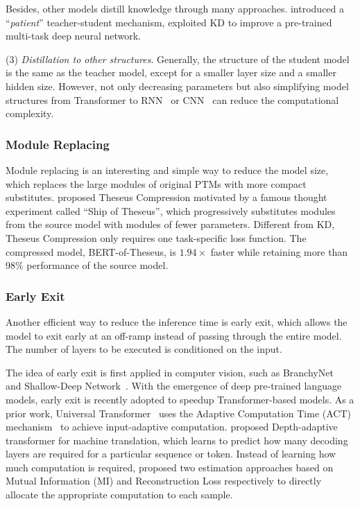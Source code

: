 \documentclass[fleqn]{SCYE-arxiv}
\begin{document}
\begin{multicols}{2}
Besides, other models distill knowledge through many approaches. \citet{sun-etal-2019-patient} introduced a ``\textit{patient}'' teacher-student mechanism, \citet{liu2019improving} exploited KD to improve a pre-trained multi-task deep neural network.

(3) \textit{Distillation to other structures}. Generally, the structure of the student model is the same as the teacher model, except for a smaller layer size and a smaller hidden size. However, not only decreasing parameters but also simplifying model structures from Transformer to RNN~\cite{tang2019distilling} or CNN~\cite{chia2019transformer} can reduce the computational complexity.

\subsubsection{Module Replacing}

Module replacing is an interesting and simple way to reduce the model size, which replaces the large modules of original PTMs with more compact substitutes.
\citet{xu2020bert} proposed Theseus Compression motivated by a famous thought experiment called ``Ship of Theseus'', which progressively substitutes modules from the source model with modules of fewer parameters.
Different from KD, Theseus Compression only requires one task-specific loss function.
The compressed model, BERT-of-Theseus, is $1.94\times$ faster while retaining more than 98\% performance of the source model.

\subsubsection{Early Exit}
Another efficient way to reduce the inference time is early exit, which allows the model to exit early at an off-ramp instead of passing through the entire model. The number of layers to be executed is conditioned on the input.

The idea of early exit is first applied in computer vision, such as BranchyNet~\cite{DBLP:conf/icpr/Teerapittayanon16} and Shallow-Deep Network~\cite{Kaya2019Shallow}. With the emergence of deep pre-trained language models, early exit is recently adopted to speedup Transformer-based models. As a prior work, Universal Transformer~\cite{DBLP:conf/iclr/DehghaniGVUK19} uses the Adaptive Computation Time (ACT) mechanism~\cite{Graves2016Adaptive} to achieve input-adaptive computation. \citet{Elbayad2020Depth} proposed Depth-adaptive transformer for machine translation, which learns to predict how many decoding layers are required for a particular sequence or token. Instead of learning how much computation is required, \citet{DBLP:conf/aaai/LiuMZCX21} proposed two estimation approaches based on Mutual Information (MI) and Reconstruction Loss respectively to directly allocate the appropriate computation to each sample.


\end{multicols}
\end{document}
